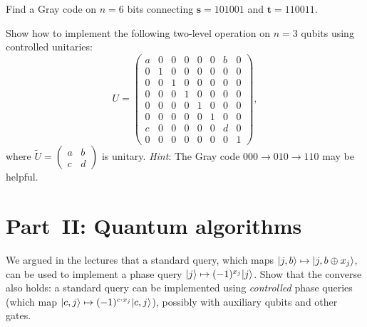 \documentclass[12pt,oneside]{amsart}
\begin{document}
\begin{exercise}\label{ex:gray}
  Find a Gray code on $n=6$ bits connecting $\mathbf{s} = 101001$ and
  $\mathbf{t}=110011$.
\end{exercise}

\begin{exercise}\label{ex:two-level-impl}
  Show how to implement the following two-level operation on $n=3$ qubits
  using controlled unitaries:
  \begin{equation}
    U = \begin{pmatrix}
      a & 0 & 0 & 0 & 0 & 0 & b & 0 \\
      0 & 1 & 0 & 0 & 0 & 0 & 0 & 0 \\
      0 & 0 & 1 & 0 & 0 & 0 & 0 & 0 \\
      0 & 0 & 0 & 1 & 0 & 0 & 0 & 0 \\
      0 & 0 & 0 & 0 & 1 & 0 & 0 & 0 \\
      0 & 0 & 0 & 0 & 0 & 1 & 0 & 0 \\
      c & 0 & 0 & 0 & 0 & 0 & d & 0 \\
      0 & 0 & 0 & 0 & 0 & 0 & 0 & 1
    \end{pmatrix},
  \end{equation}
  where $\widetilde{U}=\left(\begin{smallmatrix} a & b\\ c & d
  \end{smallmatrix}\right)$ is unitary.
  \emph{Hint}: The Gray code $000 \to 010 \to 110$ may be helpful.
\end{exercise}

\section*{Part~II: Quantum algorithms}
\setcounter{section}{2}
\setcounter{exercise}{0}

\begin{exercise}\label{ex:phase-oracle}
  We argued in the lectures that a standard query, which maps
  $|j,b\rangle\mapsto |j,b\oplus x_j\rangle$, can be used to implement a
  phase query $|j\rangle\mapsto (-1)^{x_j}|j\rangle$.  Show that the converse
  also holds: a standard query can be implemented using
  \emph{controlled} phase queries (which map
  $|c,j\rangle\mapsto (-1)^{c\cdot x_j}|c,j\rangle$), possibly with
  auxiliary qubits and other gates.
\end{exercise}
\end{document}
